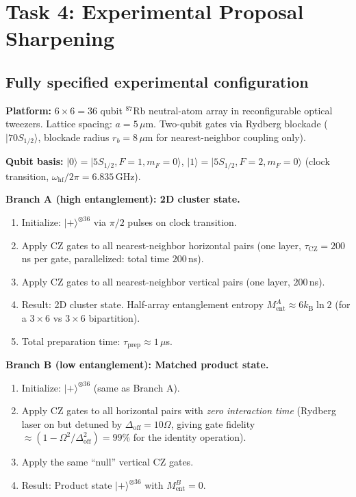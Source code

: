 \documentclass[12pt,letterpaper]{article}
\theoremstyle{plain}
\theoremstyle{definition}
\theoremstyle{remark}
\newcommand{\kB}{k_{\mathrm{B}}}
\begin{document}
\section{Task 4: Experimental Proposal Sharpening}
\label{sec:task4}

\subsection{Fully specified experimental configuration}

\textbf{Platform:} $6\times 6 = 36$ qubit $^{87}$Rb neutral-atom array in reconfigurable optical tweezers. Lattice spacing: $a = 5\,\mu$m. Two-qubit gates via Rydberg blockade ($|70S_{1/2}\rangle$, blockade radius $r_b = 8\,\mu$m for nearest-neighbor coupling only).

\textbf{Qubit basis:}
$|0\rangle = |5S_{1/2}, F=1, m_F=0\rangle$,
$|1\rangle = |5S_{1/2}, F=2, m_F=0\rangle$
(clock transition, $\omega_{\mathrm{hf}}/2\pi = 6.835$\,GHz).

\textbf{Branch A (high entanglement): 2D cluster state.}
\begin{enumerate}
\item Initialize: $|+\rangle^{\otimes 36}$ via $\pi/2$ pulses on clock transition.
\item Apply CZ gates to all nearest-neighbor horizontal pairs (one layer, $\tau_{\mathrm{CZ}} = 200$\,ns per gate, parallelized: total time $200$\,ns).
\item Apply CZ gates to all nearest-neighbor vertical pairs (one layer, $200$\,ns).
\item Result: 2D cluster state. Half-array entanglement entropy $M_{\mathrm{ent}}^A \approx 6\kB\ln 2$ (for a $3\times 6$ vs $3\times 6$ bipartition).
\item Total preparation time: $\tau_{\mathrm{prep}} \approx 1\,\mu$s.
\end{enumerate}

\textbf{Branch B (low entanglement): Matched product state.}
\begin{enumerate}
\item Initialize: $|+\rangle^{\otimes 36}$ (same as Branch A).
\item Apply CZ gates to all horizontal pairs with \emph{zero interaction time} (Rydberg laser on but detuned by $\Delta_{\mathrm{off}} = 10\Omega$, giving gate fidelity $\approx (1-\Omega^2/\Delta_{\mathrm{off}}^2) = 99\%$ for the identity operation).
\item Apply the same ``null'' vertical CZ gates.
\item Result: Product state $|+\rangle^{\otimes 36}$ with $M_{\mathrm{ent}}^B = 0$.
\end{enumerate}
\end{document}
